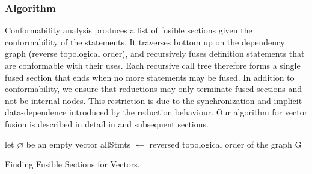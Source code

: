 \subsubsection{Algorithm}

Conformability analysis produces a list of fusible sections given the conformability of
the statements. It traverses bottom up on the dependency graph (reverse topological order),
and recursively fuses definition statements that are conformable with their uses. Each
recursive call tree therefore forms a single fused section that ends when no more
statements may be fused. In addition to conformability, we ensure that reductions may
only terminate fused sections and not be internal nodes. This restriction is due to the
synchronization and implicit data-dependence introduced by the reduction behaviour.
Our algorithm for vector fusion is described in detail in 
and subsequent sections.

\begin{algorithm}[htbp]
\begin{small}
\SetAlgoLined
{}
let $\varnothing$ be an empty vector\;
allStmts $\gets$ reversed topological order of the graph G\;
\Fna{\Funca{A}}{
    \uIf{isNotVisited(A)}{
        setVisited(A)\;
        \uIf{isGroupE_Binary(A) or isGroupS(A)}{
            list $\gets$ fetchFusibleStmts(A, A.first.parent)\;
            list.append(fetchFusibleStmts(A, A.second.parent))\;
        }
        \uElseIf{isGroupE_Unary(A) or isGroupB(A)}{
            list $\gets$ fetchFusibleStmts(A, A.first.parent)\;
        }
        \uElseIf{isGroupX(A)}{
            list $\gets$ fetchFusibleStmts(A, A.second.parent)\;
        }
        \Else{
            list $\gets$ $\varnothing$\;
        }
        \Return{\{A\}.append(list)}
    }
    \Return $\varnothing$\;
}
\end{small}

\caption{Finding Fusible Sections for Vectors.} \label{algo:conformability}
\end{algorithm}

